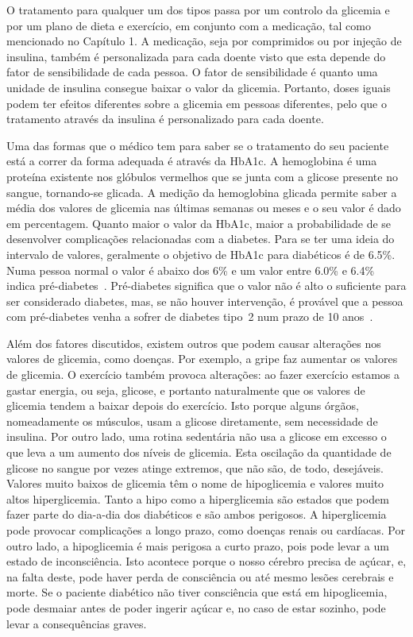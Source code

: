O tratamento para qualquer um dos tipos passa por um controlo da glicemia e por um plano de dieta e exercício, em conjunto com a medicação, tal como mencionado no Capítulo 1. A medicação, seja por comprimidos ou por injeção de insulina, também é personalizada para cada doente visto que esta depende do fator de sensibilidade de cada pessoa.
O fator de sensibilidade é quanto uma unidade de insulina consegue baixar o valor da glicemia. Portanto, doses iguais podem ter efeitos diferentes sobre a glicemia em pessoas diferentes, pelo que o tratamento através da insulina é personalizado para cada doente.

Uma das formas que o médico tem para saber se o tratamento do seu paciente está a correr da forma adequada é através da \ac{HbA1c}. A hemoglobina é uma proteína existente nos glóbulos vermelhos que se junta com a glicose presente no sangue, tornando-se glicada. A medição da hemoglobina glicada permite saber a média dos valores de glicemia nas últimas semanas ou meses e o seu valor é dado em percentagem. Quanto maior o valor da \ac{HbA1c}, maior a probabilidade de se desenvolver complicações relacionadas com a diabetes.
Para se ter uma ideia do intervalo de valores, geralmente o objetivo de \ac{HbA1c} para diabéticos é de 6.5\%. Numa pessoa normal o valor é abaixo dos 6\% e um valor entre 6.0\% e 6.4\% indica pré-diabetes~\cite{hba1c}. Pré-diabetes significa que o valor não é alto o suficiente para ser considerado diabetes, mas, se não houver intervenção, é provável que a pessoa com pré-diabetes venha a sofrer de diabetes tipo~2 num prazo de 10 anos~\cite{prediabetes}.

Além dos fatores discutidos, existem outros que podem causar alterações nos valores de glicemia, como doenças. Por exemplo, a gripe faz aumentar os valores de glicemia. O exercício também provoca alterações: ao fazer exercício estamos a gastar energia, ou seja, glicose, e portanto naturalmente que os valores de glicemia tendem a baixar depois do exercício. Isto porque alguns órgãos, nomeadamente os músculos, usam a glicose diretamente, sem necessidade de insulina. Por outro lado, uma rotina sedentária não usa a glicose em excesso o que leva a um aumento dos níveis de glicemia. Esta oscilação da quantidade de glicose no sangue por vezes atinge extremos, que não são, de todo, desejáveis. Valores muito baixos de glicemia têm o nome de hipoglicemia e valores muito altos hiperglicemia.
Tanto a hipo como a hiperglicemia são estados que podem fazer parte do dia-a-dia dos diabéticos e são ambos perigosos.  A hiperglicemia pode provocar complicações a longo prazo, como doenças renais ou cardíacas. Por outro lado, a hipoglicemia é mais perigosa a curto prazo, pois pode levar a um estado de inconsciência. Isto acontece porque o nosso cérebro precisa de açúcar, e, na falta deste, pode haver perda de consciência ou até mesmo lesões cerebrais e morte. Se o paciente diabético não tiver consciência que está em hipoglicemia, pode desmaiar antes de poder ingerir açúcar e, no caso de estar sozinho, pode levar a consequências graves.

